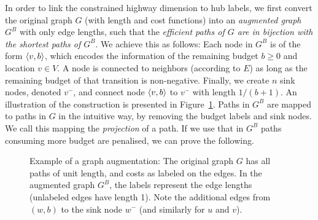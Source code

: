 In order to link the constrained highway dimension to hub labels, we first convert the original graph $G$ (with length and cost functions) into an \emph{augmented graph} $G^B$ with only edge lengths, such that the \emph{efficient paths of $G$ are in bijection with the shortest paths of $G^B$}.
We achieve this as follows: Each node in $G^B$ is of the form $\langle v,b\rangle$, which encodes the information of the remaining budget $b\geq 0$ and location $v\in V$.
A node is connected to neighbors (according to $E$) as long as the remaining budget of that transition is non-negative.
Finally, we create $n$ sink nodes, denoted $v^-$, and connect node $\langle v,b\rangle$ to $v^-$ with length $1/(b+1)$.
An illustration of the construction is presented in Figure~\ref{fig:augmented}.
Paths in $G^B$ are mapped to paths in $G$ in the intuitive way, by removing the budget labels and sink nodes.
We call this mapping the \emph{projection} of a path.
If we use that in $G^B$ paths consuming more budget are penalised, we can prove the following.


\begin{figure}

\caption{Example of a graph augmentation: The original graph $G$ has all paths of unit length, and costs as labeled on the edges. In the augmented graph $G^B$, the labels represent the edge lengths (unlabeled edges have length 1). Note the additional edges from $(w,b)$ to the sink node $w^-$ (and similarly for $u$ and $v$). 
}
\label{fig:augmented}
\end{figure}




